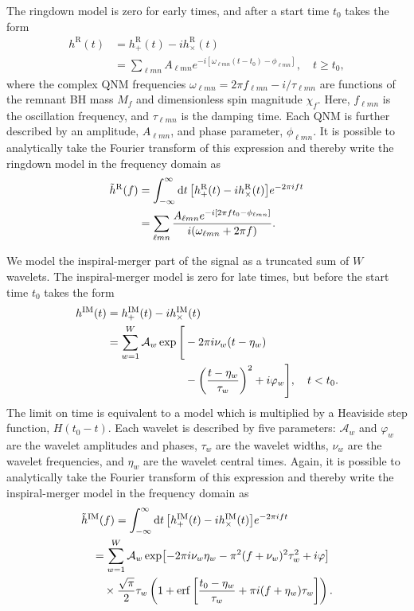 The ringdown model is zero for early times, and after a start time $t_0$ takes the form
\begin{align}
	h^\mathrm{R}(t) &= h_+^\mathrm{R}(t) - ih_\times^\mathrm{R}(t) \nonumber \\
	&= \sum_{\ell m n} A_{\ell m n} e^{-i[\omega_{\ell m n}(t-t_0) - \phi_{\ell m n}]}, \quad t \geq t_0,
\end{align}
where the complex QNM frequencies $\omega_{\ell m n} = 2\pi f_{\ell m n} - i/\tau_{\ell m n}$ are functions of the remnant BH mass $M_f$ and dimensionless spin magnitude $\chi_f$. Here, $f_{\ell m n}$ is the oscillation frequency, and $\tau_{\ell m n}$ is the damping time.
Each QNM is further described by an amplitude, $A_{\ell m n}$, and phase parameter, $\phi_{\ell m n}$. 
It is possible to analytically take the Fourier transform of this expression and thereby write the ringdown model in the frequency domain as
\begin{align}
	\Tilde{h}^{\mathrm{R}}(f) &= \int_{-\infty}^\infty \dd{t} \qty[h_+^\mathrm{R}(t) - ih_\times^\mathrm{R}(t)] e^{-2\pi i f t} \nonumber \\
	&= \sum_{\ell m n} \frac{A_{\ell m n} e^{-i[2\pi ft_0 - \phi_{\ell m n}]}}{i(\omega_{\ell m n} + 2\pi f)}.
\end{align}

We model the inspiral-merger part of the signal as a truncated sum of $W$ wavelets.
The inspiral-merger model is zero for late times, but before the start time $t_0$ takes the form
\begin{align}
	h^\mathrm{IM}(t) &=  h_+^\mathrm{IM}(t) - ih_\times^\mathrm{IM}(t) \nonumber \\
	&= \sum_{w=1}^{W} \mathcal{A}_w \exp \Bigg[-2\pi i \nu_w(t-\eta_w) \\
	&\hspace{2.46cm} - \qty(\frac{t-\eta_w}{\tau_w})^2 + i\varphi_w \Bigg], \quad t < t_0. \nonumber
\end{align}
The limit on time is equivalent to a model which is multiplied by a Heaviside step function, $H(t_0 - t)$. Each wavelet is described by five parameters: $\mathcal{A}_w$ and $\varphi_w$ are the wavelet amplitudes and phases, $\tau_w$ are the wavelet widths, $\nu_w$ are the wavelet frequencies, and $\eta_w$ are the wavelet central times. Again, it is possible to analytically take the Fourier transform of this expression and thereby write the inspiral-merger model in the frequency domain as
\begin{align}
	&\Tilde{h}^\mathrm{IM}(f) = \int_{-\infty}^\infty \dd{t} \qty[h_+^\mathrm{IM}(t) - ih_\times^\mathrm{IM}(t)] e^{-2\pi i f t} \\
	&\quad= \sum_{w=1}^{W} \mathcal{A}_w \exp[-2\pi i\nu_w \eta_w -\pi^2(f+\nu_w)^2\tau_w^2 +i\varphi] \nonumber\\
	&\quad\quad\times \frac{\sqrt{\pi}}{2}\tau_w \left(1 + \mathrm{erf} \left[ \frac{t_0-\eta_w}{\tau_w} + \pi i(f+\eta_w)\tau_w \right] \right).\nonumber
\end{align}

